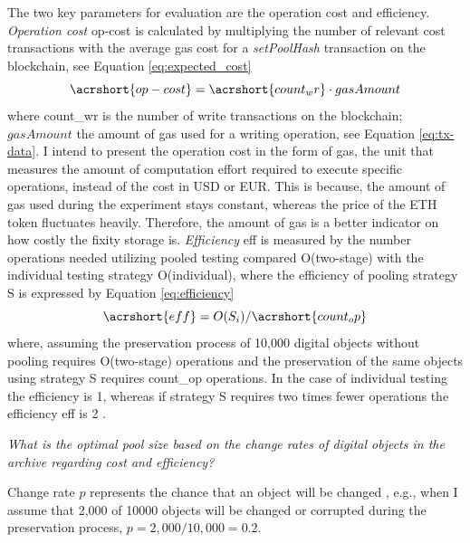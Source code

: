 \documentclass[final]{vutinfth}
\begin{document}
The two key parameters for evaluation are the operation cost and efficiency. 
\textit{Operation cost} \acrshort{op-cost} is calculated by multiplying the number of relevant cost transactions with the average gas cost for a \textit{setPoolHash} transaction on the blockchain, see Equation \ref{eq:expected_cost}
\begin{equation}\label{eq:expected_cost}
    \acrshort{op-cost} = \acrshort{count_wr} \cdot gasAmount
\end{equation}
where \acrshort{count_wr} is the number of write transactions on the blockchain; $gasAmount$ the amount of gas used for a writing operation, see Equation \ref{eq:tx-data}.
I intend to present the operation cost in the form of gas, the unit that measures the amount of computation effort required to execute specific operations, instead of the cost in USD or EUR. This is because, the amount of gas used during the experiment stays constant, whereas the price of the ETH token fluctuates heavily. Therefore, the amount of gas is a better indicator on how costly the fixity storage is.
\textit{Efficiency} \acrshort{eff} is measured by the number operations needed utilizing pooled testing compared O(\acrshort{two-stage}) with the individual testing strategy O(\acrshort{individual}), where the efficiency of pooling strategy S is expressed by Equation \ref{eq:efficiency}
\begin{equation}\label{eq:efficiency}
    \acrshort{eff} = O(S_{i})/\acrshort{count_op}
\end{equation}
where, assuming the preservation process of 10,000 digital objects without pooling requires O(\acrshort{two-stage}) operations and the preservation of the same objects using strategy S requires \acrshort{count_op} operations. In the case of individual testing the efficiency is 1, whereas if strategy S requires two times fewer operations the efficiency \acrshort{eff} is 2 \cite[4]{vzilinskas2021pooled}.

\textit{What is the optimal pool size based on the change rates of digital objects in the archive regarding cost and efficiency?}

Change rate $p$ represents the chance that an object will be changed , e.g., when I assume that 2,000 of 10000 objects will be changed or corrupted during the preservation process, $p = 2,000/10,000 = 0.2$. 
\end{document}

